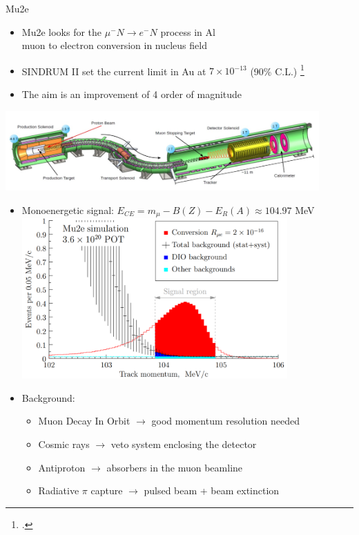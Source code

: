 \documentclass[10pt]{beamer}
\begin{document}
\begin{frame}{Mu2e}
\begin{itemize}
\setlength\itemsep{0.4cm}
\item Mu2e looks for the $\mu^- N \rightarrow e^- N$ process in Al\\
{\small muon to electron conversion in nucleus field}
\item SINDRUM II set the current limit in Au at $7\times10^{-13}$ (90\% C.L.) \footcite{SINDRUMII}
\item The aim is an improvement of 4 order of magnitude
\end{itemize}
\vspace{0.5cm}
\begin{center}
\includegraphics[width=0.9\textwidth]{mu2e_apparatus}
\end{center}
\end{frame}

\begin{frame}
\begin{itemize}
\item Monoenergetic signal: $E_{CE} = m_\mu -B(Z) -E_R(A) \approx 104.97$ MeV
\includegraphics[width=0.8\textwidth]{signal_bg}
\item Background:
\begin{itemize}
\item Muon Decay In Orbit $\rightarrow$ good momentum resolution needed
\item Cosmic rays $\rightarrow$ veto system enclosing the detector
\item Antiproton $\rightarrow$ absorbers in the muon beamline
\item Radiative $\pi$ capture $\rightarrow$ pulsed beam + beam extinction
\end{itemize}
\end{itemize}
\end{frame}
\end{document}
